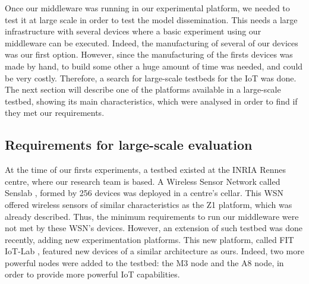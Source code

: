 

Once our middleware was running in our experimental platform, we needed to test it at large scale in order to test the model dissemination.
This needs a large infrastructure with several devices where a basic experiment using our middleware can be executed.
Indeed, the manufacturing of several of our devices was our first option.
However, since the manufacturing of the firsts devices was made by hand, to build some other a huge amount of time was needed, and could be very costly.
Therefore, a search for large-scale testbeds for the IoT was done.
The next section will describe one of the platforms available in a large-scale testbed, showing its main characteristics, which were analysed in order to find if they met our requirements.

\subsection{Requirements for large-scale evaluation}
\label{sec:iotlab}
At the time of our firsts experiments, a testbed existed at the INRIA Rennes centre, where our research team is based.
A Wireless Sensor Network called Senslab \cite{des2011senslab}, formed by 256 devices was deployed in a centre's cellar.
This WSN offered wireless sensors of similar characteristics as the Z1 platform, which was already described.
Thus, the minimum requirements to run our middleware were not met by these WSN's devices.
However, an extension of such testbed was done recently, adding new experimentation platforms.
This new platform, called FIT IoT-Lab \cite{Fleury15iotlab}, featured new devices of a similar architecture as ours.
Indeed, two more powerful nodes were added to the testbed: the M3 node and the A8 node, in order to provide more powerful IoT capabilities.

